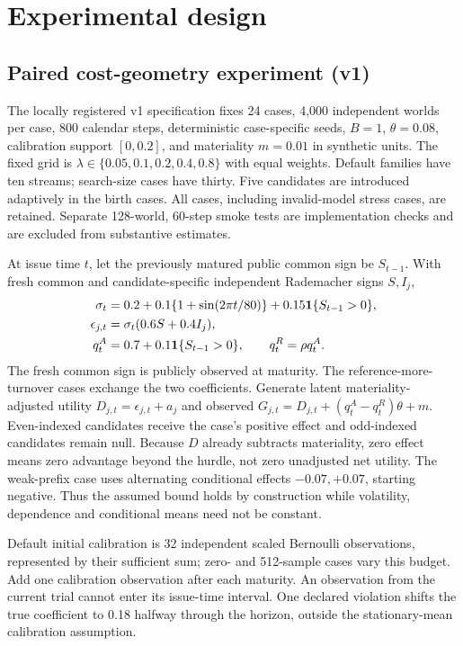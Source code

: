 \section{Experimental design}

\subsection{Paired cost-geometry experiment (v1)}

The locally registered v1 specification fixes 24 cases, 4,000 independent worlds
per case, 800 calendar steps, deterministic case-specific seeds, $B=1$,
$\theta=0.08$, calibration support $[0,0.2]$, and materiality $m=0.01$ in
synthetic units. The fixed grid is
$\lambda\in\{0.05,0.1,0.2,0.4,0.8\}$ with equal weights. Default families
have ten streams; search-size cases have thirty. Five candidates are introduced
adaptively in the birth cases. All cases, including invalid-model stress cases,
are retained. Separate 128-world, 60-step smoke tests are implementation checks
and are excluded from substantive estimates.

At issue time $t$, let the previously matured public common sign be $S_{t-1}$.
With fresh common and candidate-specific independent Rademacher signs $S,I_j$,
\begin{align}
 \sigma_t&=0.2+0.1\{1+\sin(2\pi t/80)\}
                  +0.15\mathbf{1}\{S_{t-1}>0\},\\
 \epsilon_{j,t}&=\sigma_t(0.6S+0.4I_j),\\
 q^A_t&=0.7+0.1\mathbf{1}\{S_{t-1}>0\},\qquad q^R_t=\rho q^A_t.
\end{align}
The fresh common sign is publicly observed at maturity. The reference-more-
turnover cases exchange the two coefficients. Generate latent materiality-
adjusted utility $D_{j,t}=\epsilon_{j,t}+a_j$ and observed
$G_{j,t}=D_{j,t}+(q^A_t-q^R_t)\theta+m$. Even-indexed candidates receive the
case's positive effect and odd-indexed candidates remain null. Because $D$
already subtracts materiality, zero effect means zero advantage beyond the
hurdle, not zero unadjusted net utility. The weak-prefix
case uses alternating conditional effects $-0.07,+0.07$, starting negative.
Thus the assumed bound holds by construction while volatility, dependence and
conditional means need not be constant.

Default initial calibration is 32 independent scaled Bernoulli observations,
represented by their sufficient sum; zero- and 512-sample cases vary this
budget. Add one calibration observation after each maturity. An observation
from the current trial cannot enter its issue-time interval. One declared
violation shifts the true coefficient to 0.18 halfway through the horizon,
outside the stationary-mean calibration assumption.

